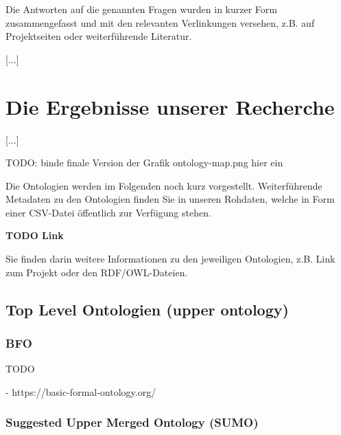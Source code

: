 \documentclass{article}
\begin{document}
Die Antworten auf die genannten Fragen wurden in kurzer Form zusammengefasst und mit den relevanten Verlinkungen versehen, z.B. auf Projektseiten oder weiterführende Literatur.

[...]


\section{Die Ergebnisse unserer Recherche}

[...]

TODO: binde finale Version der Grafik ontology-map.png hier ein

Die Ontologien werden im Folgenden noch kurz vorgestellt.
Weiterführende Metadaten zu den Ontologien finden Sie in unseren Rohdaten, welche in Form einer CSV-Datei öffentlich zur Verfügung stehen.

\textbf{TODO Link}

Sie finden darin weitere Informationen zu den jeweiligen Ontologien, z.B. Link zum Projekt oder den RDF/OWL-Dateien.

\subsection{Top Level Ontologien (upper ontology)}

\subsubsection{BFO}

TODO

- https://basic-formal-ontology.org/

\subsubsection{Suggested Upper Merged Ontology (SUMO)}
\end{document}

